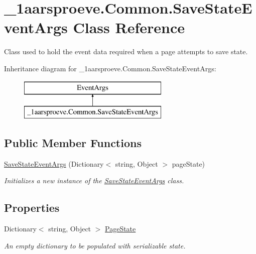 \hypertarget{class__1aarsproeve_1_1_common_1_1_save_state_event_args}{}\section{\+\_\+1aarsproeve.\+Common.\+Save\+State\+Event\+Args Class Reference}
\label{class__1aarsproeve_1_1_common_1_1_save_state_event_args}


Class used to hold the event data required when a page attempts to save state.  


Inheritance diagram for \+\_\+1aarsproeve.\+Common.\+Save\+State\+Event\+Args\+:\begin{figure}[H]
\begin{center}
\leavevmode
\includegraphics[height=2.000000cm]{class__1aarsproeve_1_1_common_1_1_save_state_event_args}
\end{center}
\end{figure}
\subsection*{Public Member Functions}
\begin{DoxyCompactItemize}
\item 
\hyperlink{class__1aarsproeve_1_1_common_1_1_save_state_event_args_ada2f56029afefc9938cb8567190037f9}{Save\+State\+Event\+Args} (Dictionary$<$ string, Object $>$ page\+State)
\begin{DoxyCompactList}\small\item\em Initializes a new instance of the \hyperlink{class__1aarsproeve_1_1_common_1_1_save_state_event_args}{Save\+State\+Event\+Args} class. \end{DoxyCompactList}\end{DoxyCompactItemize}
\subsection*{Properties}
\begin{DoxyCompactItemize}
\item 
Dictionary$<$ string, Object $>$ \hyperlink{class__1aarsproeve_1_1_common_1_1_save_state_event_args_a8c2a073606d2429d985a1747707c6c29}{Page\+State}
\begin{DoxyCompactList}\small\item\em An empty dictionary to be populated with serializable state. \end{DoxyCompactList}\end{DoxyCompactItemize}


